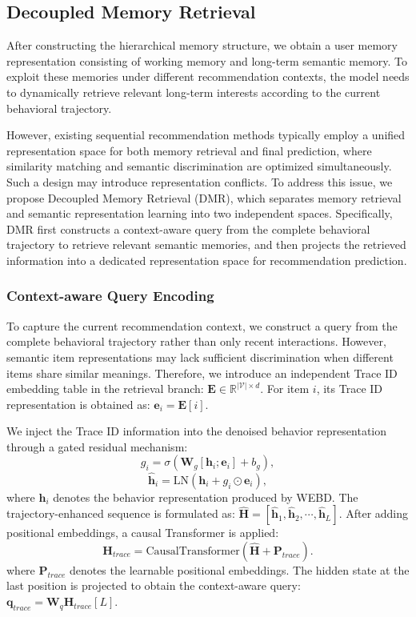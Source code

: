 \documentclass[letterpaper]{article} %
\theoremstyle{definition} %
\begin{document}
\subsection{Decoupled Memory Retrieval}

After constructing the hierarchical memory structure, we obtain a user memory representation consisting of working memory and long-term semantic memory. To exploit these memories under different recommendation contexts, the model needs to dynamically retrieve relevant long-term interests according to the current behavioral trajectory.

However, existing sequential recommendation methods typically employ a unified representation space for both memory retrieval and final prediction, where similarity matching and semantic discrimination are optimized simultaneously. Such a design may introduce representation conflicts. To address this issue, we propose Decoupled Memory Retrieval (DMR), which separates memory retrieval and semantic representation learning into two independent spaces. Specifically, DMR first constructs a context-aware query from the complete behavioral trajectory to retrieve relevant semantic memories, and then projects the retrieved information into a dedicated representation space for recommendation prediction.


\subsubsection{Context-aware Query Encoding}

To capture the current recommendation context, we construct a query from the complete behavioral trajectory rather than only recent interactions. However, semantic item representations may lack sufficient discrimination when different items share similar meanings. Therefore, we introduce an independent Trace ID embedding table in the retrieval branch: $\bm{E} \in \mathbb{R}^{|\mathcal V| \times d}.$ For item $i$, its Trace ID representation is obtained as: $\bm{e}_i=\bm{E}[i].$

We inject the Trace ID information into the denoised behavior representation through a gated residual mechanism:
\begin{equation}
g_i = \sigma\!\left(\bm{W}_g[\bm{h}_i;\bm{e}_i]+b_g\right),
\end{equation}
\begin{equation}
\hat{\bm{h}}_i
=
\text{LN}(\bm{h}_i+g_i\odot\bm{e}_i),
\end{equation}
where $\bm{h}_i$ denotes the behavior representation produced by WEBD. The trajectory-enhanced sequence is formulated as: $\hat{\bm{H}}
=
[\hat{\bm{h}}_1,\hat{\bm{h}}_2,\cdots,\hat{\bm{h}}_L]$. After adding positional embeddings, a causal Transformer is applied:
\begin{equation}
\bm{H}_{trace}
=
\text{CausalTransformer}
(\hat{\bm{H}}+\bm{P}_{trace}).
\end{equation}
where $\bm{P}_{trace}$ denotes the learnable positional embeddings. The hidden state at the last position is projected to obtain the context-aware query: $\bm{q}_{trace}=\bm{W}_{q}\bm{H}_{trace}[L]$.
\end{document}
